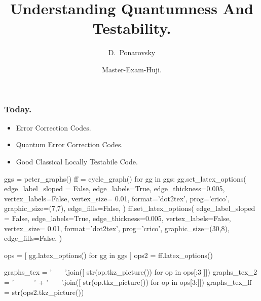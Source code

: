 \documentclass[usenames, aspectratio=169]{beamer}
\title[Understanding Quantumness And Testability.] %
{Understanding Quantumness And Testability.}
\subtitle{  }
\author[D.~Ponarovsky] %
	{D.~Ponarovsky\inst{1}}
\institute[HUJI] %
{  Faculty of Computer Science\newline
  Hebrew University of Jerusalem
}
\date[2023] %
{Master-Exam-Huji.}
\newcommand{\pslsq}[4]{
\begin{frame}
    \frametitle{#1} 
    \texttt{[image: ../source/\#3]}
    #4  
  \end{frame}
}
\begin{document}

\begin{frame}
  \maketitle
\end{frame}

\begin{frame}
  \frametitle{ Today. }
  \begin{itemize}
    \item<1-> Error Correction Codes. 
    \item<2->Quantum Error Correction Codes.
    \item<3->Good Classical Locally Testabile Code.
  \end{itemize} 
\end{frame}

\begin{frame}
\begin{sagesilent}
   
ggs = peter_graphs()
ff = cycle_graph()
for gg in ggs:
  gg.set_latex_options(
          edge_label_sloped = False,
          edge_labels=True,
          edge_thickness=0.005,
          vertex_labels=False,
          vertex_size= 0.01,
          format='dot2tex',
          prog='crico',
          graphic_size=(7,7),
          edge_fills=False,
      )
  ff.set_latex_options(
          edge_label_sloped = False,
          edge_labels=True,
          edge_thickness=0.005,
          vertex_labels=False,
          vertex_size= 0.01,
          format='dot2tex',
          prog='crico',
          graphic_size=(30,8),
          edge_fills=False,
      )
 
ops = [ gg.latex_options() for gg in ggs ] 
ops2 = ff.latex_options()

graphs_tex =  ' \ \ \ '.join([  str(op.tkz_picture())  for op in ops[:3 ]])
graphs_tex_2 = ' \ \ \ \ \ ' +  ' \ \ \ '.join([  str(op.tkz_picture())  for op in ops[3:]])
graphs_tex_ff  = str(ops2.tkz_picture())
\end{sagesilent}

%
\end{frame} 
\end{document}
